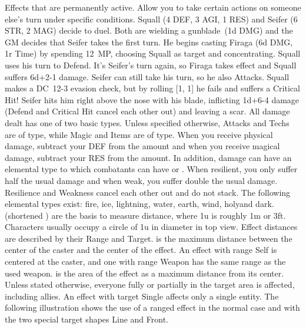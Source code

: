  Effects that are permanently active. \ofgap
{} Allow you to take certain actions on someone else's turn under specific conditions.
%
\vfill
%
{
	Squall (4 DEF, 3 AGI, 1 RES) and Seifer (6 STR, 2 MAG) decide to duel.
	Both are wielding a gunblade~(1d DMG) and the GM decides that Seifer takes the first turn.
	He begins casting Firaga (6d DMG, 1r Time) by spending 12~MP, choosing Squall as target and concentrating.
	Squall uses his turn to Defend.
	It's Seifer's turn again, so Firaga takes effect and Squall suffers \mbox{6d+2-1} damage. 
	Seifer can still take his turn, so he also Attacks. 
	Squall makes a \mbox{DC 12-3} evasion check, but by rolling [1, 1] he fails and suffers a Critical Hit! 
	Seifer hits him right above the nose with his blade, inflicting \mbox{1d+6-4} damage (Defend and Critical Hit cancel each other out) and leaving a scar.
}
%
\clearpage
%
All damage dealt has one of two basic types.
Unless specified otherwise, Attacks and Techs are of  type, while Magic and Items are of  type.
When you receive physical damage, subtract your DEF from the amount and when you receive magical damage, subtract your RES from the amount.
In addition, damage can have an elemental type to which combatants can have  or . 
When resilient, you only suffer half the usual damage and when weak, you suffer double the usual damage. 
Resilience and Weakness cancel each other out and do not stack.
The following elemental types exist: fire\oficonfire, ice\oficonice, lightning\oficonlightning, water\oficonwater, \mbox{earth\oficonearth}, wind\oficonwind, holy\oficonholy and dark\oficondark.
%
\vfill
%
 (shortened ) are the basis to measure distance, where 1u is roughly 1m or 3ft.
Characters usually occupy a circle of 1u in diameter in top view. 
Effect distances are described by their Range and Target.
 is the maximum distance between the center of the caster and the center of the effect. 
An effect with range Self is centered at the caster, and one with range Weapon has the same range as the used weapon.
 is the area of the effect as a maximum distance from its center. Unless stated otherwise, everyone fully or partially in the target area is affected, including allies.
An effect with target Single affects only a single entity.
The following illustration shows the use of a ranged effect in the normal case and with the two special target shapes Line and Front. 
